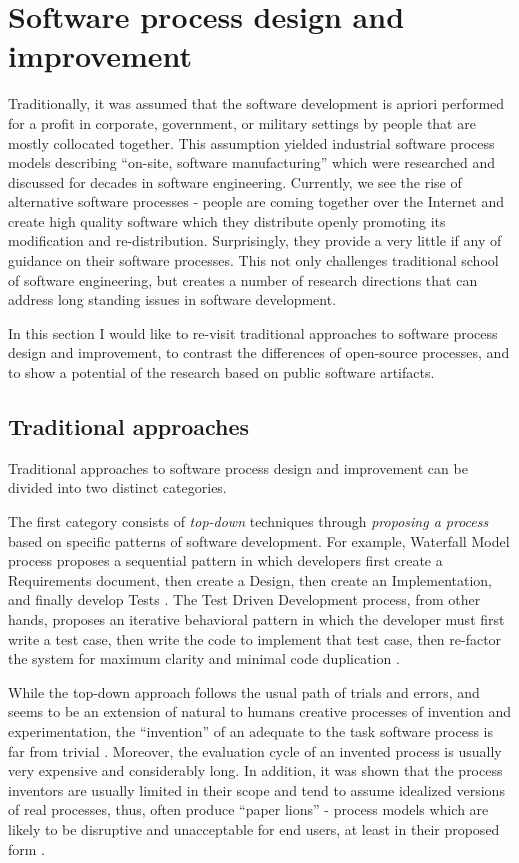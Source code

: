 %
%
\section{Software process design and improvement}\label{section_software_process_design}
Traditionally, it was assumed that the software development is apriori performed for a profit in 
corporate, government, or military settings by people that are mostly collocated together. 
This assumption yielded industrial software process models describing ``on-site, software manufacturing'' 
which were researched and discussed for decades in software  engineering. 
Currently, we see the rise of alternative software processes - people are coming 
together over the Internet and create high quality software which they distribute openly 
promoting its modification and re-distribution. Surprisingly, they provide a very little if any of
guidance on their software processes. This not only challenges traditional school of software 
engineering, but creates a number of research directions that can address long standing issues 
in software development.

In this section I would like to re-visit traditional approaches to software process design and improvement, 
to contrast the differences of open-source processes, and to show a potential of the research based 
on public software artifacts.

\subsection{Traditional approaches}\label{sec_floss_processes}
Traditional approaches to software process design and improvement can be divided into two distinct categories. 

The first category consists of \textit{top-down} techniques through \textit{proposing a process} based 
on specific patterns of software development. 
For example, Waterfall Model process proposes a sequential pattern in which developers first create a 
Requirements document, then create a Design, then create an Implementation, and finally develop Tests 
\cite{citeulike:9982731}. 
The Test Driven Development process, from other hands, proposes an iterative behavioral pattern in which
the developer must first write a test case, then write the code to implement that test case, then re-factor the 
system for maximum clarity and minimal code duplication \cite{citeulike:6086365}. 

While the top-down approach follows the usual path of trials and errors, and seems to be an 
extension of natural to humans creative processes of invention and experimentation, 
the ``invention'' of an adequate to the task software process is far from trivial 
\cite{citeulike:5043104} \cite{citeulike:1986013}. 
Moreover, the evaluation cycle of an invented process is usually very expensive and considerably long.
In addition, it was shown that the process inventors are usually limited in their scope and tend to 
assume idealized versions of real processes, thus, often produce ``paper lions'' - process models which are 
likely to be disruptive and unacceptable for end users, at least in their proposed form \cite{citeulike:9758924}.

